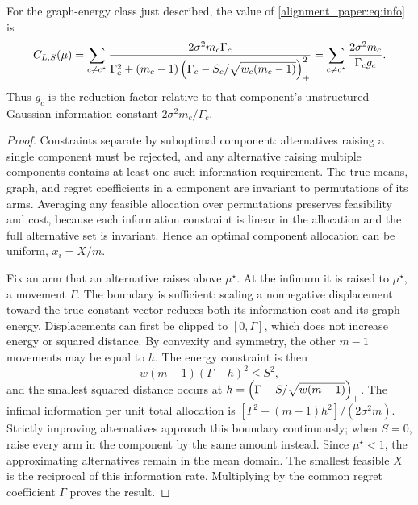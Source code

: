 \begin{theorem}
For the graph-energy class just described, the value of \eqref{alignment_paper:eq:info} is
\begin{equation}
 C_{L,S}(\mu)=\sum_{c\ne c^\star}
 \frac{2\sigma^2 m_c\Gamma_c}
 {\Gamma_c^2+(m_c-1)
       \left(\Gamma_c-S_c/\sqrt{w_c(m_c-1)}\right)_+^2}
 =\sum_{c\ne c^\star}\frac{2\sigma^2m_c}{\Gamma_c g_c}.
 \label{alignment_paper:eq:cliqueconstant}
\end{equation}
Thus $g_c$ is the reduction factor relative to that component's unstructured Gaussian information constant $2\sigma^2m_c/\Gamma_c$.
\label{alignment_paper:thm:clique}
\end{theorem}
\begin{proof}
Constraints separate by suboptimal component: alternatives raising a single component must be rejected, and any alternative raising multiple components contains at least one such information requirement. The true means, graph, and regret coefficients in a component are invariant to permutations of its arms. Averaging any feasible allocation over permutations preserves feasibility and cost, because each information constraint is linear in the allocation and the full alternative set is invariant. Hence an optimal component allocation can be uniform, $x_i=X/m$.

Fix an arm that an alternative raises above $\mu^\star$. At the infimum it is raised to $\mu^\star$, a movement $\Gamma$. The boundary is sufficient: scaling a nonnegative displacement toward the true constant vector reduces both its information cost and its graph energy. Displacements can first be clipped to $[0,\Gamma]$, which does not increase energy or squared distance. By convexity and symmetry, the other $m-1$ movements may be equal to $h$. The energy constraint is then
\begin{equation}
 w(m-1)(\Gamma-h)^2\le S^2,
\end{equation}
and the smallest squared distance occurs at
$h=\left(\Gamma-S/\sqrt{w(m-1)}\right)_+$.
The infimal information per unit total allocation is
$[\Gamma^2+(m-1)h^2]/(2\sigma^2m)$.
Strictly improving alternatives approach this boundary continuously; when $S=0$, raise every arm in the component by the same amount instead. Since $\mu^\star<1$, the approximating alternatives remain in the mean domain. The smallest feasible $X$ is the reciprocal of this information rate. Multiplying by the common regret coefficient $\Gamma$ proves the result.
\end{proof}

